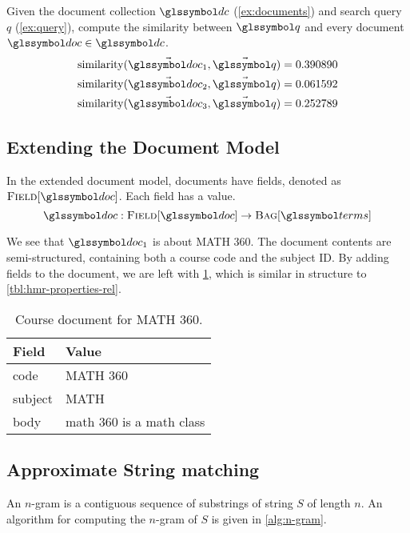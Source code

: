 		\begin{ex}
			Given the document collection \(\dc\) (\cref{ex:documents}) and search query \(q\) (\cref{ex:query}), compute the similarity between \(\q\) and every document \(\doc \in \dc\).
			\begin{align}
				\similarity(\vec{\doc_1}, \vec{\q}) = 0.390890 \\
				\similarity(\vec{\doc_2}, \vec{\q}) = 0.061592 \\
				\similarity(\vec{\doc_3}, \vec{\q}) = 0.252789
			\end{align}
		\end{ex}
		
	\subsection{Extending the Document Model}
	\label{sec:extending-the-document-model}
		In the extended document model, documents have fields, denoted as \(\fields{\doc}\).  Each field has a value.
		\[
			\doc : \fields{\doc} \to \bag{\terms}
		\]
		
		\begin{ex}
			We see that \(\doc_1\) is about MATH 360.  The document contents are semi-structured, containing both a course code and the subject ID.  By adding fields to the document, we are left with \cref{tbl:course-document}, which is similar in structure to \cref{tbl:hmr-properties-rel}.
			
			\begin{table}
				\centering
				
				\begin{tabular}{ll}
					\toprule
					Field & Value \\
					\midrule
					code & MATH 360 \\
					subject & MATH \\
					body & math 360 is a math class \\
					\bottomrule
				\end{tabular}
				
				\caption{Course document for MATH 360.}
				\label{tbl:course-document}
			\end{table}
		\end{ex}
		
	\subsection{Approximate String matching}
	\label{sec:n-gram}
		\begin{defn}[N-Gram]
			An \(n\)-gram is a contiguous sequence of substrings of string \(S\) of length \(n\).	 An algorithm for computing the \(n\)-gram of \(S\) is given in \cref{alg:n-gram}. 
		\end{defn}
		
